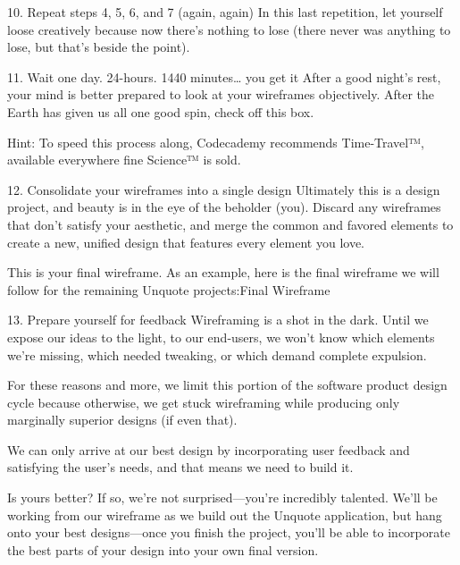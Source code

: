         10. Repeat steps 4, 5, 6, and 7 (again, again)
            In this last repetition, let yourself loose creatively because now there’s nothing to lose (there never was anything to lose, but that’s beside the point).

        11. Wait one day. 24-hours. 1440 minutes… you get it
            After a good night’s rest, your mind is better prepared to look at your wireframes objectively. After the Earth has given us all one good spin, check off this box.

            Hint: To speed this process along, Codecademy recommends Time-Travel™, available everywhere fine Science™ is sold.

        12. Consolidate your wireframes into a single design
            Ultimately this is a design project, and beauty is in the eye of the beholder (you). Discard any wireframes that don’t satisfy your aesthetic, and merge the common and favored elements to create a new, unified design that features every element you love.

            This is your final wireframe. As an example, here is the final wireframe we will follow for the remaining Unquote projects:Final Wireframe

        13. Prepare yourself for feedback
            Wireframing is a shot in the dark. Until we expose our ideas to the light, to our end-users, we won’t know which elements we’re missing, which needed tweaking, or which demand complete expulsion.

            For these reasons and more, we limit this portion of the software product design cycle because otherwise, we get stuck wireframing while producing only marginally superior designs (if even that).

            We can only arrive at our best design by incorporating user feedback and satisfying the user’s needs, and that means we need to build it.

            Is yours better? If so, we’re not surprised—you’re incredibly talented. We’ll be working from our wireframe as we build out the Unquote application, but hang onto your best designs—once you finish the project, you’ll be able to incorporate the best parts of your design into your own final version.